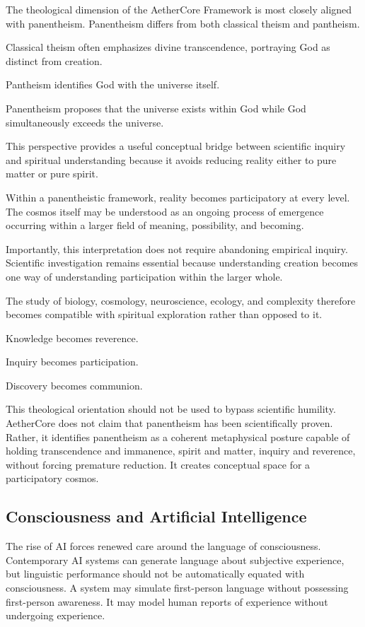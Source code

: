 \documentclass[12pt]{article}
\begin{document}
The theological dimension of the AetherCore Framework is most closely aligned with panentheism. Panentheism differs from both classical theism and pantheism.

Classical theism often emphasizes divine transcendence, portraying God as distinct from creation.

Pantheism identifies God with the universe itself.

Panentheism proposes that the universe exists within God while God simultaneously exceeds the universe.

This perspective provides a useful conceptual bridge between scientific inquiry and spiritual understanding because it avoids reducing reality either to pure matter or pure spirit.

Within a panentheistic framework, reality becomes participatory at every level. The cosmos itself may be understood as an ongoing process of emergence occurring within a larger field of meaning, possibility, and becoming.

Importantly, this interpretation does not require abandoning empirical inquiry. Scientific investigation remains essential because understanding creation becomes one way of understanding participation within the larger whole.

The study of biology, cosmology, neuroscience, ecology, and complexity therefore becomes compatible with spiritual exploration rather than opposed to it.

Knowledge becomes reverence.

Inquiry becomes participation.

Discovery becomes communion.

This theological orientation should not be used to bypass scientific humility. AetherCore does not claim that panentheism has been scientifically proven. Rather, it identifies panentheism as a coherent metaphysical posture capable of holding transcendence and immanence, spirit and matter, inquiry and reverence, without forcing premature reduction. It creates conceptual space for a participatory cosmos.

\subsection{Consciousness and Artificial Intelligence}

The rise of AI forces renewed care around the language of consciousness. Contemporary AI systems can generate language about subjective experience, but linguistic performance should not be automatically equated with consciousness. A system may simulate first-person language without possessing first-person awareness. It may model human reports of experience without undergoing experience.
\end{document}
